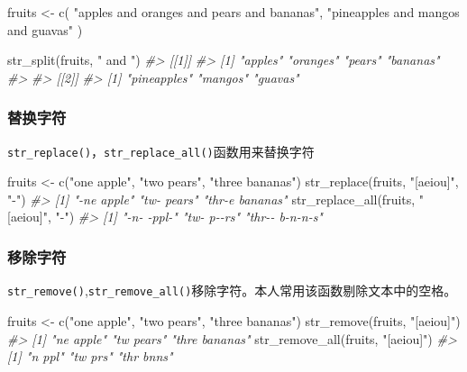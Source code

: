\documentclass[
]{book}
\newenvironment{Shaded}{\begin{snugshade}}{\end{snugshade}}
\newcommand{\CommentTok}[1]{\textcolor[rgb]{0.56,0.35,0.01}{\textit{#1}}}
\newcommand{\FunctionTok}[1]{\textcolor[rgb]{0.00,0.00,0.00}{#1}}
\newcommand{\NormalTok}[1]{#1}
\newcommand{\OtherTok}[1]{\textcolor[rgb]{0.56,0.35,0.01}{#1}}
\newcommand{\StringTok}[1]{\textcolor[rgb]{0.31,0.60,0.02}{#1}}
\begin{document}
\begin{Shaded}
\begin{Highlighting}[]
\NormalTok{fruits }\OtherTok{\textless{}{-}} \FunctionTok{c}\NormalTok{(}
  \StringTok{"apples and oranges and pears and bananas"}\NormalTok{,}
  \StringTok{"pineapples and mangos and guavas"}
\NormalTok{)}

\FunctionTok{str\_split}\NormalTok{(fruits, }\StringTok{" and "}\NormalTok{)}
\CommentTok{\#\textgreater{} [[1]]}
\CommentTok{\#\textgreater{} [1] "apples"  "oranges" "pears"   "bananas"}
\CommentTok{\#\textgreater{} }
\CommentTok{\#\textgreater{} [[2]]}
\CommentTok{\#\textgreater{} [1] "pineapples" "mangos"     "guavas"}
\end{Highlighting}
\end{Shaded}

\hypertarget{ux66ffux6362ux5b57ux7b26}{%
\subsubsection{替换字符}\label{ux66ffux6362ux5b57ux7b26}}

\texttt{str\_replace()}，\texttt{str\_replace\_all()}函数用来替换字符

\begin{Shaded}
\begin{Highlighting}[]
\NormalTok{fruits }\OtherTok{\textless{}{-}} \FunctionTok{c}\NormalTok{(}\StringTok{"one apple"}\NormalTok{, }\StringTok{"two pears"}\NormalTok{, }\StringTok{"three bananas"}\NormalTok{)}
\FunctionTok{str\_replace}\NormalTok{(fruits, }\StringTok{"[aeiou]"}\NormalTok{, }\StringTok{"{-}"}\NormalTok{)}
\CommentTok{\#\textgreater{} [1] "{-}ne apple"     "tw{-} pears"     "thr{-}e bananas"}
\FunctionTok{str\_replace\_all}\NormalTok{(fruits, }\StringTok{"[aeiou]"}\NormalTok{, }\StringTok{"{-}"}\NormalTok{)}
\CommentTok{\#\textgreater{} [1] "{-}n{-} {-}ppl{-}"     "tw{-} p{-}{-}rs"     "thr{-}{-} b{-}n{-}n{-}s"}
\end{Highlighting}
\end{Shaded}

\hypertarget{ux79fbux9664ux5b57ux7b26}{%
\subsubsection{移除字符}\label{ux79fbux9664ux5b57ux7b26}}

\texttt{str\_remove()},\texttt{str\_remove\_all()}移除字符。本人常用该函数剔除文本中的空格。

\begin{Shaded}
\begin{Highlighting}[]
\NormalTok{fruits }\OtherTok{\textless{}{-}} \FunctionTok{c}\NormalTok{(}\StringTok{"one apple"}\NormalTok{, }\StringTok{"two pears"}\NormalTok{, }\StringTok{"three bananas"}\NormalTok{)}
\FunctionTok{str\_remove}\NormalTok{(fruits, }\StringTok{"[aeiou]"}\NormalTok{)}
\CommentTok{\#\textgreater{} [1] "ne apple"     "tw pears"     "thre bananas"}
\FunctionTok{str\_remove\_all}\NormalTok{(fruits, }\StringTok{"[aeiou]"}\NormalTok{)}
\CommentTok{\#\textgreater{} [1] "n ppl"    "tw prs"   "thr bnns"}
\end{Highlighting}
\end{Shaded}
\end{document}

